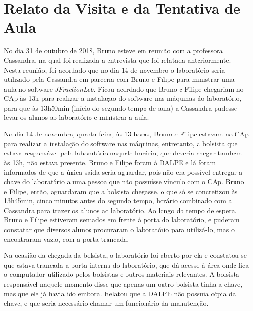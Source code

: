 \chapter{Relato da Visita e da Tentativa de Aula}\label{chp:LABEL_CHP_REL}

No dia 31 de outubro de 2018, Bruno esteve em reunião com a professora Cassandra, na qual foi realizada a entrevista que foi relatada anteriormente. Nesta reunião, foi acordado que no dia 14 de novembro o laboratório seria utilizado pela Cassandra em parceria com Bruno e Filipe para ministrar uma aula no software \textit{JFractionLab}. Ficou acordado que Bruno e Filipe chegariam no CAp às 13h para realizar a instalação do software nas máquinas do laboratório, para que às 13h50min (início do segundo tempo de aula) a Cassandra pudesse levar os alunos ao laboratório e ministrar a aula.

No dia 14 de novembro, quarta-feira, às 13 horas, Bruno e Filipe estavam no CAp para realizar a instalação do software nas máquinas, entretanto, a bolsista que estava responsável pelo laboratório naquele horário, que deveria chegar também às 13h, não estava presente. Bruno e Filipe foram à DALPE e lá foram informados de que a única saída seria aguardar, pois não era possível entregar a chave do laboratório a uma pessoa que não possuísse vínculo com o CAp. Bruno e Filipe, então, aguardaram que a bolsista chegasse, o que só se concretizou às 13h45min, cinco minutos antes do segundo tempo, horário combinado com a Cassandra para trazer os alunos ao laboratório. Ao longo do tempo de espera, Bruno e Filipe estiveram sentados em frente à porta do laboratório, e puderam constatar que diversos alunos procuraram o laboratório para utilizá-lo, mas o encontraram vazio, com a porta trancada.

Na ocasião da chegada da bolsista, o laboratório foi aberto por ela e constatou-se que estava trancada a porta interna do laboratório, que dá acesso à área onde fica o computador utilizado pelos bolsistas e outros materiais relevantes. A bolsista responsável naquele momento disse que apenas um outro bolsista tinha a chave, mas que ele já havia ido embora. Relatou que a DALPE não possuía cópia da chave, e que seria necessário chamar um funcionário da manutenção.

